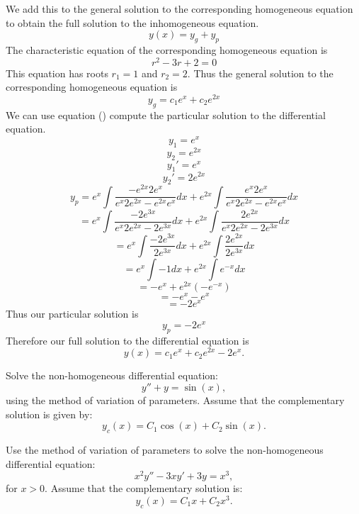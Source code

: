 We add this to the general solution to the corresponding homogeneous equation to obtain the full solution to the inhomogeneous equation.
\[y(x) = y_g + y_p\]
The characteristic equation of the corresponding homogeneous equation is
\[r^2 - 3r + 2 = 0\]
This equation has roots $r_1 = 1$ and $r_2 = 2$. Thus the general solution to the corresponding homogeneous equation is
\[y_g = c_1e^x + c_2e^{2x}\]
We can use equation () compute the particular solution to the differential equation.
\[y_1 = e^x\]
\[y_2 = e^{2x}\]
\[y_1' = e^x\]
\[y_2' = 2e^{2x}\]
\[y_p = e^x\int \frac{-e^{2x}2e^x}{e^x2e^{2x} - e^{2x}e^x}dx + e^{2x}\int \frac{e^x2e^x}{e^x2e^{2x} - e^{2x}e^x}dx\]
\[= e^x\int \frac{-2e^{3x}}{e^x2e^{2x} - 2e^{3x}}dx + e^{2x}\int \frac{2e^{2x}}{e^x2e^{2x} - 2e^{3x}}dx\]
\[= e^x\int \frac{-2e^{3x}}{2e^{3x}}dx + e^{2x}\int \frac{2e^{2x}}{2e^{3x}}dx\]
\[= e^x\int -1dx + e^{2x}\int e^{-x}dx\]
\[= -e^x + e^{2x}(-e^{-x})\]
\[= -e^x - e^x\]
\[= -2e^x\]
Thus our particular solution is
\[y_p = -2e^x\]
Therefore our full solution to the differential equation is
\[y(x) = c_1e^x + c_2e^{2x} - 2e^x.\]
\exercises
\begin{exerciselist}
\item Solve the non-homogeneous differential equation:
\[y'' + y = \sin(x),\]
using the method of variation of parameters. Assume that the complementary solution is given by:
\[y_c(x) = C_1 \cos(x) + C_2 \sin(x).\]
\item Use the method of variation of parameters to solve the non-homogeneous differential equation:
\[x^2 y'' - 3x y' + 3y = x^3,\]
for \( x > 0 \). Assume that the complementary solution is:
\[y_c(x) = C_1 x + C_2 x^3.\]
\end{exerciselist}
